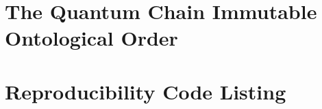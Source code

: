 \documentclass[11pt,a4paper,onecolumn]{article}
\theoremstyle{plain}
\theoremstyle{definition}
\theoremstyle{remark}
\begin{document}

\section{The Quantum Chain Immutable Ontological Order}\label{app:quantum_chain}


\section{Reproducibility Code Listing}\label{app:code}

\end{document}
